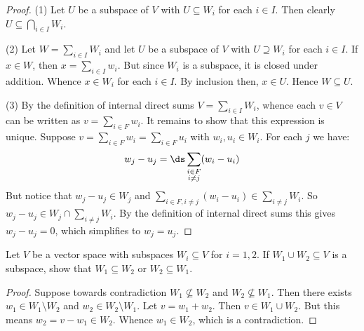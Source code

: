 \documentclass[11pt,twoside,openany]{memoir}
\begin{document}
        \begin{proof}
            (1) Let $U$ be a subspace of $V$ with $U \subseteq W_i$ for each $i \in I$. Then clearly $U \subseteq \bigcap_{i \in I}W_i$. \nl

            \noindent (2) Let $W = \sum_{i \in I}W_i$ and let $U$ be a subspace of $V$ with $U \supseteq W_i$ for each $i \in I$. If $x \in W$, then $x = \sum_{i \in I}w_i$. But since $W_i$ is a subspace, it is closed under addition. Whence $x \in W_i$ for each $i \in I$. By inclusion then, $x \in U$. Hence $W \subseteq U$. \nl

            \noindent (3) By the definition of internal direct sums $V = \sum_{i \in I}W_i$, whence each $v \in V$ can be written as $v = \sum_{i \in F}w_i$. It remains to show that this expression is unique. Suppose $v = \sum_{i \in F}w_i = \sum_{i \in F}u_i$ with $w_i,u_i \in W_i$. For each $j$ we have:
                \begin{equation*}
                \begin{split}
                    w_j - u_j = \ds \sum_{\mathclap{\substack{ i \in F \\ i \neq j }}} (w_i - u_i)
                \end{split}
                \end{equation*}
            But notice that $w_j - u_j \in W_j$ and $ \sum_{i \in F, i \neq j } (w_i - u_i) \in \sum_{i \neq j}W_i$. So $w_j - u_j \in W_j \cap \sum_{i \neq j}W_i$. By the definition of internal direct sums this gives $w_j - u_j = 0$, which simplifies to $w_j = u_j$. 
        \end{proof}
   \addtocounter{exercise}{1}
    \begin{exercise}
        Let $V$ be a vector space with subspaces $W_i \subseteq V$ for $i = 1,2$. If $W_1 \cup W_2 \subseteq V$ is a subspace, show that $W_1 \subseteq W_2$ or $W_2 \subseteq W_1$.
    \end{exercise}
        \begin{proof}
            Suppose towards contradiction $W_1 \not\subseteq W_2$ and $W_2 \not\subseteq W_1$. Then there exists $w_1 \in W_1 \setminus W_2$ and $w_2 \in W_2 \setminus W_1$. Let $v = w_1 + w_2$. Then $v \in W_1 \cup W_2$. But this means $w_2 = v - w_1 \in W_2$. Whence $w_1 \in W_2$, which is a contradiction.
        \end{proof}
\end{document}
